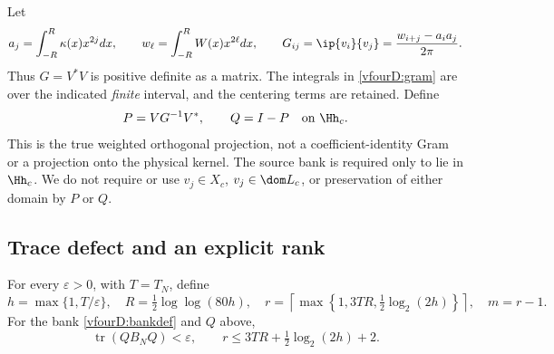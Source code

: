 Let
\begin{equation}\label{vfourD:gram}
 a_j=\int_{-R}^{R}\kappa(x)x^{2j}dx,\qquad w_\ell=\int_{-R}^{R}W(x)x^{2\ell}dx,\qquad
 G_{ij}=\ip{v_i}{v_j}=\frac{w_{i+j}-a_i a_j}{2\pi}.
\end{equation}
Thus $G=V^*V$ is positive definite as a matrix. The integrals in \eqref{vfourD:gram} are over the indicated \emph{finite} interval, and the centering terms are retained. Define
\[P=VG^{-1}V^*,\qquad Q=I-P\quad\text{on }\Hh_c.\]
This is the true weighted orthogonal projection, not a coefficient-identity Gram or a projection onto the physical kernel. The source bank is required only to lie in $\Hh_c$. We do not require or use $v_j\in X_c$, $v_j\in\dom L_c$, or preservation of either domain by $P$ or $Q$.

\subsection{Trace defect and an explicit rank}\label{vfourD:compression}
\begin{theorem}\label{vfourD:defect}
For every $\varepsilon>0$, with $T=T_N$, define
\begin{equation}\label{vfourD:parameters}
 h=\max\{1,T/\varepsilon\},\quad R=\tfrac12\log\log(80h),\quad
 r=\left\lceil\max\left\{1,3TR,\tfrac12\log_2(2h)\right\}\right\rceil,\quad m=r-1.
\end{equation}
For the bank \eqref{vfourD:bankdef} and $Q$ above,
\begin{equation}\label{vfourD:traceerror}
 \operatorname{tr}(QB_NQ)<\varepsilon,\qquad
 r\le3TR+\tfrac12\log_2(2h)+2.
\end{equation}
\end{theorem}
